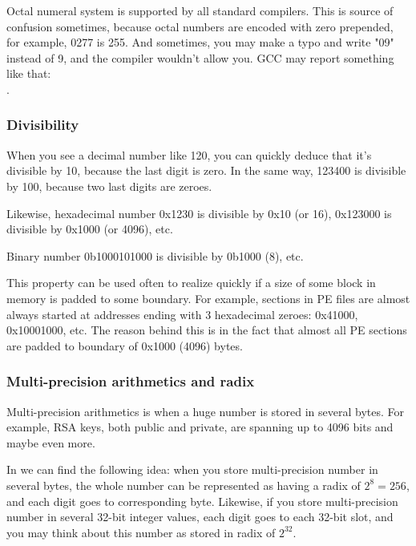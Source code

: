 Octal numeral system is supported by all standard \CCpp compilers.
This is source of confusion sometimes, because octal numbers are encoded with zero prepended, for example, 0277 is 255.
And sometimes, you may make a typo and write "09" instead of 9, and the compiler wouldn't allow you.
GCC may report something like that:\\
.

\subsubsection{Divisibility}

When you see a decimal number like 120, you can quickly deduce that it's divisible by 10, because the last digit is zero.
In the same way, 123400 is divisible by 100, because two last digits are zeroes.

Likewise, hexadecimal number 0x1230 is divisible by 0x10 (or 16), 0x123000 is divisible by 0x1000 (or 4096), etc.

Binary number 0b1000101000 is divisible by 0b1000 (8), etc.

This property can be used often to realize quickly if a size of some block in memory is padded to some boundary.
For example, sections in \ac{PE} files are almost always started at addresses ending with 3 hexadecimal zeroes: 0x41000, 0x10001000, etc.
The reason behind this is in the fact that almost all \ac{PE} sections are padded to boundary of 0x1000 (4096) bytes.

\subsubsection{Multi-precision arithmetics and radix}

Multi-precision arithmetics is when a huge number is stored in several bytes.
For example, RSA keys, both public and private, are spanning up to 4096 bits and maybe even more.

In  we can find the following idea: when you store multi-precision number in several bytes,
the whole number can be represented as having a radix of $2^8=256$, and each digit goes to corresponding byte.
Likewise, if you store multi-precision number in several 32-bit integer values, each digit goes to each 32-bit slot,
and you may think about this number as stored in radix of $2^{32}$.

